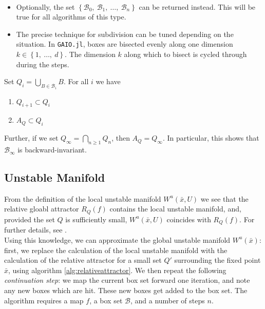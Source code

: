 \begin{remark}\
    \begin{itemize}
        \item Optionally, the set 
        $\left\{ \mathcal{B}_0,\ \mathcal{B}_1,\ \dotsc,\ \mathcal{B}_n \right\}$
        can be returned instead. This will be true for all algorithms of this type.
        \item The precise technique for subdivision can be tuned depending on the situation. 
        In \texttt{GAIO.jl}, boxes are bisected evenly along one dimension 
        $k \in \left\{1,\ \dotsc,\ d\right\}$. The dimension $k$ along which to bisect is 
        cycled through during the steps. \\
    \end{itemize}
\end{remark}

\begin{proposition}
    \cite*{algGAIO,subalg} Set $Q_i = \bigcup\limits_{B \in \mathcal{B}_i} B$. For all 
    $i$ we have

    \begin{enumerate}
        \item $Q_{i+1} \subset Q_i$
        \item $A_Q \subset Q_i$ 
    \end{enumerate}

    Further, if we set $Q_\infty = \bigcap\limits_{n \geq 1} Q_n$, then 
    $A_Q = Q_\infty$. In particular, this shows that $\mathcal{B}_\infty$ 
    is backward-invariant. 
\end{proposition}


\subsection{Unstable Manifold}

From the definition of the local unstable manifold $W^u(\bar{x}, U)$ we see that the 
relative gloabl attractor $R_Q(f)$ contains the local unstable manifold, and, provided the 
set $Q$ is sufficiently small, $W^u(\bar{x}, U)$ coincides with $R_Q(f)$. For further 
details, see \cite*{manifold, geodynbook}. \\

Using this knowledge, we can approximate the global unstable manifold $W^u(\bar{x})$: first, we 
replace the calculation of the local unstable manifold with the calculation of the relative
attractor for a small set $Q'$ surrounding the fixed point $\bar{x}$, using algorithm
\ref{alg:relativeattractor}. We then repeat the following \emph{continuation step}: we map 
the current box set forward one iteration, and note any new boxes which are hit. These new 
boxes get added to the box set. The algorithm requires a map $f$, a box set $\mathcal{B}$, 
and a number of steps $n$.\\

